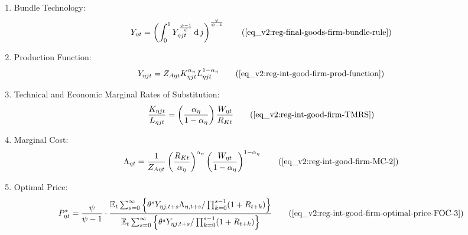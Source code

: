 \documentclass[../thesis.tex]{subfiles}
\begin{document}
{\begin{itemize}
\begin{enumerate}
		\item Bundle Technology:
		\begin{align}
			Y_{\eta t} = \left( \int_{0}^{1} Y_{\eta jt}^{\frac{\psi-1}{\psi}} \dif j \right)^{\frac{\psi}{\psi-1}} \tag{\ref{eq_v2:reg-final-goods-firm-bundle-rule}}
		\end{align}
		
		\item Production Function:
		\begin{align}
			Y_{\eta jt} = Z_{A\eta t} K_{\eta jt}^{\alpha_{\eta}} L_{\eta jt}^{1-{\alpha_{\eta}}} 
			\tag{\ref{eq_v2:reg-int-good-firm-prod-function}}
		\end{align}

		\item Technical and Economic Marginal Rates of Substitution:
		\begin{align}
			\frac{K_{\eta jt}}{L_{\eta jt}} = \left( \frac{{\alpha_{\eta}}}{1-\alpha_{\eta}} \right) \frac{W_{\eta t}}{R_{Kt}} \tag{\ref{eq_v2:reg-int-good-firm-TMRS}}
		\end{align}

\begin{comment}
	\item Capital Demand: 
	\begin{align}
		K_{\eta jt} & = \frac{Y_{\eta jt}}{Z_{A\eta t}} \left[ \left( \frac{{\alpha_{\eta}}}{1-\alpha_{\eta}} \right) \frac{W_{\eta t}}{R_{Kt}}\right]^{1-\alpha_{\eta}} \tag{\ref{eq_v2:reg-int-good-firm-Kt-demand}}
	\end{align}
	
	\item Labor Demand:
	\begin{align}
		L_{\eta jt} & = \frac{Y_{\eta jt}}{Z_{A\eta t}} \left[ \left( \frac{{\alpha_{\eta}}}{1-\alpha_{\eta}} \right) \frac{W_{\eta t}}{R_{Kt}}\right]^{-{\alpha_{\eta}}} \tag{\ref{eq_v2:reg-int-good-firm-Lt-demand}}
	\end{align}
\end{comment}

		\item Marginal Cost:
		\begin{align}
			\Lambda_{\eta t} = \frac{1}{Z_{A\eta t}} \left( \frac{R_{Kt}}{{\alpha_{\eta}}} \right)^{{\alpha_{\eta}}} \left( \frac{W_{\eta t}}{1-\alpha_{\eta}} \right)^{1-\alpha_{\eta}} \tag{\ref{eq_v2:reg-int-good-firm-MC-2}}
		\end{align}

		\item Optimal Price:
		\begin{align}
			P_{\eta t}^{\ast} = \frac{\psi}{\psi-1} \cdot \frac{ \E \sum_{s=0}^{\infty} \left\{ \theta^s Y_{\eta j,t+s} \Lambda_{\eta, t+s} / \prod_{k=0}^{s-1}(1+R_{t+k}) \right\}} {\E \sum_{s=0}^{\infty} \left\{ \theta^s Y_{\eta j,t+s} / \prod_{k=0}^{s-1}(1 + R_{t+k}) \right\}} \tag{\ref{eq_v2:reg-int-good-firm-optimal-price-FOC-3}}
		\end{align}
		

\end{enumerate}
\end{itemize}}
\end{document}
